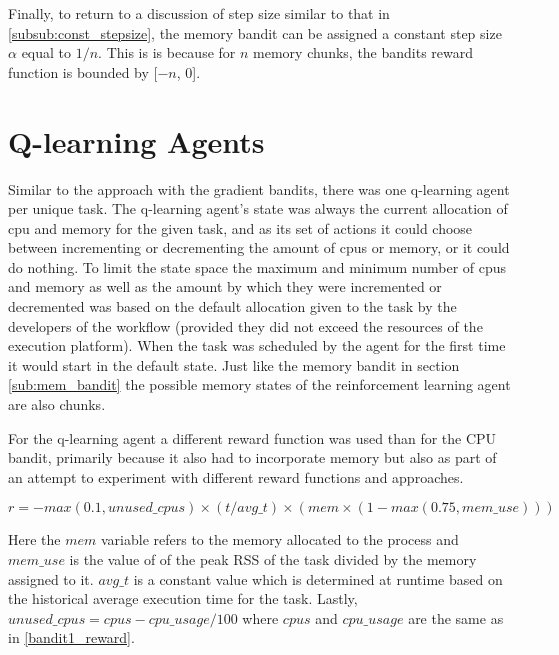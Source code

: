 Finally, to return to a discussion of step size similar to that in \ref{subsub:const_stepsize}, the memory bandit can be assigned a constant step size $\alpha$ equal to $1/n$. This is is because for $n$ memory chunks, the bandits reward function is bounded by [$-n$, 0]. 


\section{Q-learning Agents}
\label{sec:q_agent}

Similar to the approach with the gradient bandits, there was one q-learning agent per unique task. The q-learning agent’s state was always the current allocation of cpu and memory for the given task, and as its set of actions it could choose between incrementing or decrementing the amount of cpus or memory, or it could do nothing. To limit the state space the maximum and minimum number of cpus and memory as well as the amount by which they were incremented or decremented was based on the default allocation given to the task by the developers of the workflow (provided they did not exceed the resources of the execution platform). When the task was scheduled by the agent for the first time it would start in the default state. Just like the memory bandit in section \ref{sub:mem_bandit} the possible memory states of the reinforcement learning agent are also chunks. 

For the q-learning agent a different reward function was used than for the CPU bandit, primarily because it also had to incorporate memory but also as part of an attempt to experiment with different reward functions and approaches. 

\begin{equation}
\label{q_agent_1_reward}
r = -max(0.1,unused\_cpus) \times (t/avg\_t) \times (mem\times (1 - max(0.75,mem\_use)))
\end{equation}

Here the $mem$ variable refers to the memory allocated to the process and $mem\_use$ is the value of of the peak RSS of the task divided by the memory assigned to it. $avg\_t$ is a constant value which is determined at runtime based on the historical average execution time for the task. Lastly, $unused\_cpus = cpus - cpu\_usage/100$ where $cpus$ and $cpu\_usage$ are the same as in \ref{bandit1_reward}. 

